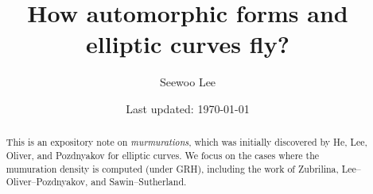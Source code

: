 \documentclass[10pt,letterpaper]{article}
\begin{document}

\title{How automorphic forms and elliptic curves fly?}


\author{Seewoo Lee}
\date{\normalsize\vspace{-1ex} Last updated: \today}


\maketitle


\begin{abstract}
    This is an expository note on \emph{murmurations}, which was initially discovered by He, Lee, Oliver, and Pozdnyakov for elliptic curves.
    We focus on the cases where the mumuration density is computed (under GRH), including the work of Zubrilina, Lee--Oliver--Pozdnyakov, and Sawin--Sutherland.
\end{abstract}










\newpage




{
\small
}







\end{document}
